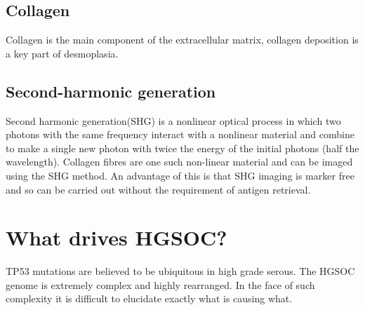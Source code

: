 \subsection{Collagen}
Collagen is the main component of the extracellular matrix, collagen deposition is a key part of desmoplasia. 

\subsection{Second-harmonic generation}

Second harmonic generation(SHG) is a nonlinear optical process in which two photons with the same frequency interact with a nonlinear material and combine to make a single new photon with twice the energy of the initial photons (half the wavelength). Collagen fibres are one such non-linear material and can be imaged using the SHG method. An advantage of this is that SHG imaging is marker free and so can be carried out without the requirement of antigen retrieval. 


\section{What drives HGSOC?} %

TP53 mutations are believed to be ubiquitous in high grade serous. The HGSOC genome is extremely complex and highly rearranged. In the face of such complexity it is difficult to elucidate exactly what is causing what.  \citep{RN17}



